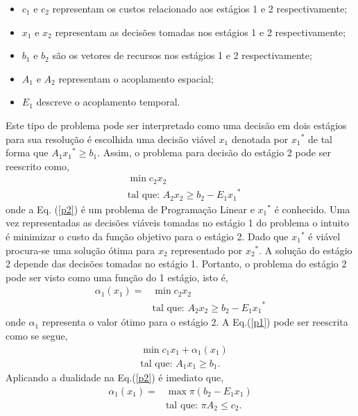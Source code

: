 \documentclass[12pt,fleqn]{article}
\begin{document}
\begin{itemize}
  \item $c_1$ e $c_2$ representam os custos relacionado aos est\'agios 1 e 2 respectivamente;
  \item $x_1$ e $x_2$ representam as decis\~oes tomadas nos est\'agios 1 e 2 respectivamente;
  \item $b_1$ e $b_2$  s\~ao os vetores de recursos nos est\'agios 1 e 2 respectivamente;   \item $A_1$ e $A_2$ representam o acoplamento espacial;
  \item $E_1$ descreve o acoplamento temporal.
\end{itemize}
Este tipo de problema pode ser interpretado como uma decis\~ao em dois est\'agios para sua resolu\c c\~ao \'e
escolhida uma decis\~ao vi\'avel $x_1$ denotada por ${x_1}^{*}$ de tal forma que $A_1{x_1}^{*} \geq b_1$. 
Assim, o problema para decis\~ao do est\'agio 2 pode ser reescrito como, 
\begin{align}
 & 	\min c_2x_2  \nonumber\\
&\mbox{tal que: }A_2 x_2 \geq b_2 - 	{E_1 x_1}^{*}  
    \label{p2}
\end{align}
onde a Eq. (\ref {p2}) \'e um problema de Programa\c c\~ao Linear e ${x_1}^{*}$ \'e conhecido. Uma vez representadas as decis\~oes vi\'aveis tomadas no est\'agio 1 do
problema o intuito \'e minimizar o custo da fun\c c\~ao objetivo para o est\'agio 2. Dado que ${x_1}^{*}$ \'e vi\'avel procura-se uma solu\c c\~ao \'otima para $x_2$ representado por
${x_2}^{*}$. A solu\c c\~ao do est\'agio 2 depende das decis\~oes tomadas no est\'agio 1. Portanto, o
problema do est\'agio 2 pode ser visto como uma fun\c c\~ao do 1 est\'agio, isto \'e,
\begin{align}
	\alpha_{1} (x_1) =& \min c_2x_2  \nonumber\\
	&\mbox{tal que: }A_2 x_2 \geq b_2 - 	{E_1 x_1}^{*}  
    \label{p3}
\end{align}
onde ${\alpha}_{1}$ representa o valor \'otimo para o est\'agio 2. A Eq.(\ref{p1}) pode ser reescrita como se segue,
\begin{align}
  &\min c_1x_1 + {\alpha}_{1}(x_1) \nonumber\\
&\mbox{tal que: }	A_1x_1 \geq b_1.
  \end{align}
Aplicando a dualidade na Eq.(\ref{p2}) \'e imediato que,
\begin{align}
 \alpha_{1}(x_1) = &\max \pi (b_2 - E_1x_1 )\nonumber \\
	&\mbox{tal que: }\pi A_2  \leq c_2.
 	\label{p4}
\end{align}
\end{document}
